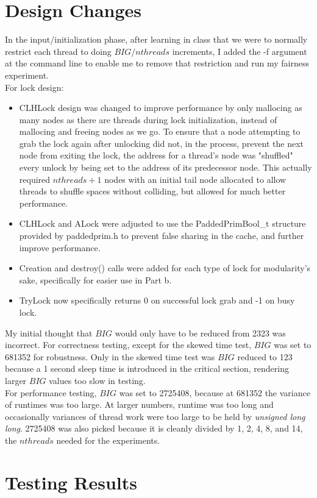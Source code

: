 \documentclass{article}
\begin{document}
\begin{adjustwidth}{-2cm}{-2cm}
\section{Design Changes}
In the input/initialization phase, after learning in class that we were to normally restrict each thread to doing $BIG/nthreads$ increments, I added the -f argument at the command line to enable me to remove that restriction and run my fairness experiment.\\
For lock design:
\begin{itemize}
	\item CLHLock design was changed to improve performance by only mallocing as many nodes as there are threads during lock initialization, instead of mallocing and freeing nodes as we go. To ensure that a node attempting to grab the lock again after unlocking did not, in the process, prevent the next node from exiting the lock, the address for a thread's node was "shuffled" every unlock by being set to the address of its predecessor node. This actually required $nthreads + 1$ nodes with an initial tail node allocated to allow threads to shuffle spaces without colliding, but allowed for much better performance.
	\item CLHLock and ALock were adjusted to use the PaddedPrimBool\_t structure provided by paddedprim.h to prevent false sharing in the cache, and further improve performance.
	\item Creation and destroy() calls were added for each type of lock for modularity's sake, specifically for easier use in Part b. 
	\item TryLock now specifically returns 0 on successful lock grab and -1 on busy lock.
\end{itemize}
My initial thought that $BIG$ would only have to be reduced from 2323 was incorrect. For correctness testing, except for the skewed time test, $BIG$ was set to 681352 for robustness. Only in the skewed time test was $BIG$ reduced to 123 because a 1 second sleep time is introduced in the critical section, rendering larger $BIG$ values too slow in testing.\\
For performance testing, $BIG$ was set to 2725408, because at 681352 the variance of runtimes was too large. At larger numbers, runtime was too long and occasionally variances of thread work were too large to be held by \textit{unsigned long long}. 2725408 was also picked because it is cleanly divided by 1, 2, 4, 8, and 14, the $nthreads$ needed for the experiments.

\section{Testing Results}

\end{adjustwidth}
\end{document}
